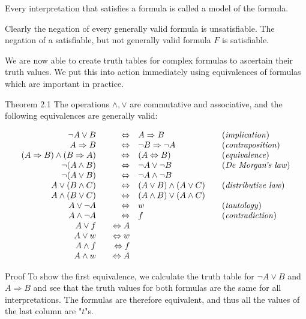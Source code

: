 \documentclass[10pt]{book}
\begin{document}
Every interpretation that satisfies a formula is called a model of the formula.

Clearly the negation of every generally valid formula is unsatisfiable. The negation of a satisfiable, but not generally valid formula $F$ is satisfiable.

We are now able to create truth tables for complex formulas to ascertain their truth values. We put this into action immediately using equivalences of formulas which are important in practice.

Theorem 2.1 The operations $\wedge, \vee$ are commutative and associative, and the following equivalences are generally valid:

$$
\begin{array}{rlrlrl}
\neg A \vee B & & \Leftrightarrow & A \Rightarrow B & & \text{(\textit{implication})} \\
A \Rightarrow B & & \Leftrightarrow & \neg B \Rightarrow \neg A & & \text{(\textit{contraposition})} \\
(A \Rightarrow B) \wedge(B \Rightarrow A) & & \Leftrightarrow & (A \Leftrightarrow B) & & \text{(\textit{equivalence})} \\
\neg(A \wedge B) & & \Leftrightarrow & \neg A \vee \neg B & & \text{(\textit{De Morgan's law})} \\
\neg(A \vee B) & & \Leftrightarrow & \neg A \wedge \neg B & & \\
A \vee(B \wedge C) & & \Leftrightarrow & (A \vee B) \wedge(A \vee C) & & \text{(\textit{distributive law})} \\
A \wedge(B \vee C) & & \Leftrightarrow & (A \wedge B) \vee(A \wedge C) & & \\
A \vee \neg A & & \Leftrightarrow & w & & \text{(\textit{tautology})} \\
A \wedge \neg A & & \Leftrightarrow & f & & \text{(\textit{contradiction})} \\
A \vee f & & \Leftrightarrow A & & \\
A \vee w & & \Leftrightarrow w & & \\
A \wedge f & & \Leftrightarrow f & & \\
A \wedge w & & \Leftrightarrow A & &
\end{array}
$$

Proof To show the first equivalence, we calculate the truth table for $\neg A \vee B$ and $A \Rightarrow B$ and see that the truth values for both formulas are the same for all interpretations. The formulas are therefore equivalent, and thus all the values of the last column are "$t$"s.
\end{document}
